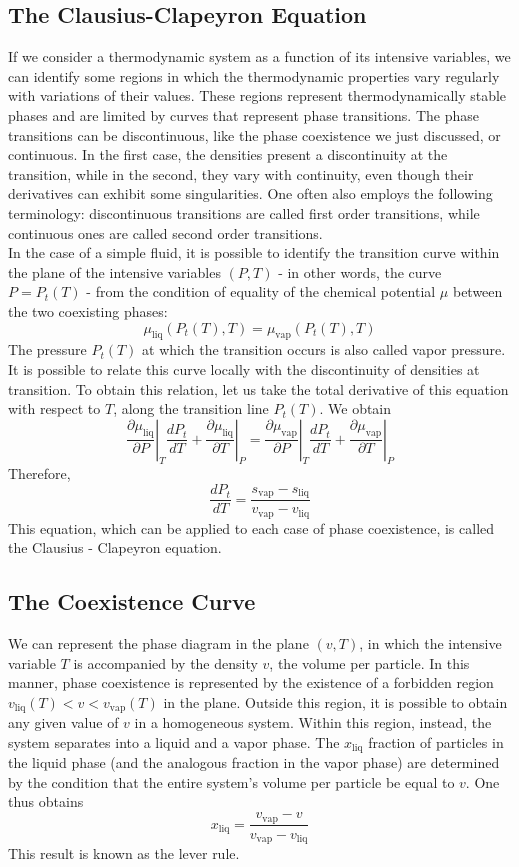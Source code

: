 \subsection{The Clausius-­Clapeyron Equation}
If we consider a thermodynamic system as a function of its intensive variables, we can identify some regions in which the thermodynamic properties vary regularly with variations of their values. These regions represent thermodynamically stable phases and are limited by curves that represent phase transitions. The phase transitions can be discontinuous, like the phase coexistence we just discussed, or continuous. In the first case, the densities present a discontinuity at the transition, while in the second, they vary with continuity, even though their derivatives can exhibit some singularities. One often also employs the following terminology: discontinuous transitions are called first order transitions, while continuous ones are called second order transitions.
\\
In the case of a simple fluid, it is possible to identify the transition curve within the plane of the intensive variables $(P,T)$ - in other words, the curve $P= P_t(T)$ - from the condition of equality of the chemical potential $\mu$ between the two coexisting phases:
\[\mu_{\mathrm{liq}}(P_t(T),T) = \mu_{\mathrm{vap}}(P_t(T),T)\]
The pressure $P_t(T)$ at which the transition occurs is also called vapor pressure. It is possible to relate this curve locally with the discontinuity of densities at transition. To obtain this relation, let us take the total derivative of this equation with respect to $T$, along the transition line $P_t(T)$. We obtain
\[\left. \frac{\partial \mu_{\mathrm{liq}}}{\partial P} \right|_{T} \frac{dP_t}{dT} + \left. \frac{\partial \mu_{\mathrm{liq}}}{\partial T} \right|_{P} = \left. \frac{\partial \mu_{\mathrm{vap}}}{\partial P} \right|_{T} \frac{dP_t}{dT} + \left. \frac{\partial \mu_{\mathrm{vap}}}{\partial T} \right|_{P}\]
Therefore,
\[\frac{dP_t}{dT} = \frac{s_{\mathrm{vap}}-s_{\mathrm{liq}}}{v_{\mathrm{vap}}-v_{\mathrm{liq}}}\]
This equation, which can be applied to each case of phase coexistence, is called the Clausius - Clapeyron equation.

\subsection{The Coexistence Curve}
We can represent the phase diagram in the plane $(v,T)$, in which the intensive variable $T$ is accompanied by the density $v$, the volume per particle. In this manner, phase coexistence is represented by the existence of a forbidden region $v_{\mathrm{liq}}(T) < v < v_{\mathrm{vap}}(T)$ in the plane. Outside this region, it is possible to obtain any given value of $v$ in a homogeneous system. Within this region, instead, the system separates into a liquid and a vapor phase. The $x_{\mathrm{liq}}$ fraction of particles in the liquid phase (and the analogous fraction in the vapor phase) are determined by the condition that the entire system's volume per particle be equal to $v$. One thus obtains
\[x_{\mathrm{liq}} = \frac{v_{\mathrm{vap}}-v}{v_{\mathrm{vap}}-v_{\mathrm{liq}}}\]
This result is known as the lever rule.

